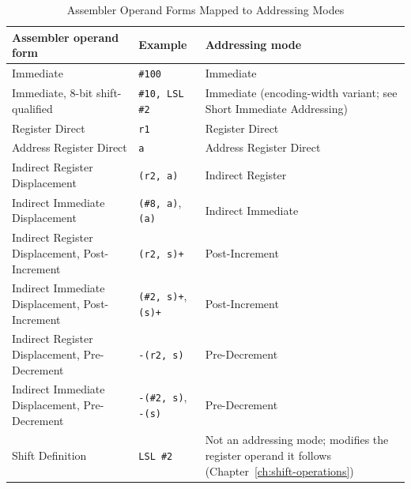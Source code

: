 \begin{table}[H]
	\centering
	\scriptsize
	\begin{tabularx}{\textwidth}{>{\raggedright\arraybackslash}p{5.5cm}>{\raggedright\arraybackslash}p{3.2cm}>{\raggedright\arraybackslash}X}
		\toprule
		\textbf{Assembler operand form}                 & \textbf{Example}                  & \textbf{Addressing mode}                                                                             \\
		\midrule
		Immediate                                       & \texttt{\#100}                    & Immediate                                                                                            \\
		Immediate, 8-bit shift-qualified                & \texttt{\#10, LSL \#2}            & Immediate (encoding-width variant; see Short Immediate Addressing)                                   \\
		Register Direct                                 & \texttt{r1}                       & Register Direct                                                                                      \\
		Address Register Direct                         & \texttt{a}                        & Address Register Direct                                                                              \\
		Indirect Register Displacement                  & \texttt{(r2, a)}                  & Indirect Register                                                                                    \\
		Indirect Immediate Displacement                 & \texttt{(\#8, a)}, \texttt{(a)}   & Indirect Immediate                                                                                   \\
		Indirect Register Displacement, Post-Increment  & \texttt{(r2, s)+}                 & Post-Increment                                                                                       \\
		Indirect Immediate Displacement, Post-Increment & \texttt{(\#2, s)+}, \texttt{(s)+} & Post-Increment                                                                                       \\
		Indirect Register Displacement, Pre-Decrement   & \texttt{-(r2, s)}                 & Pre-Decrement                                                                                        \\
		Indirect Immediate Displacement, Pre-Decrement  & \texttt{-(\#2, s)}, \texttt{-(s)} & Pre-Decrement                                                                                        \\
		Shift Definition                                & \texttt{LSL \#2}                  & Not an addressing mode; modifies the register operand it follows (Chapter~\ref{ch:shift-operations}) \\
		\bottomrule
	\end{tabularx}
	\caption{Assembler Operand Forms Mapped to Addressing Modes}
	\label{tab:addr-mode-forms}
\end{table}

